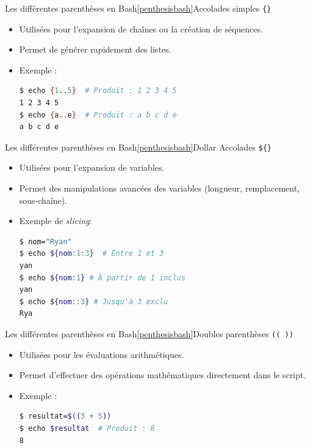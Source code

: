 \documentclass{beamer}
\begin{document}
    \begin{frame}[fragile]{Les différentes parenthèses en Bash\cref{penthesisbash}}{Accolades simples \texttt{\{\}}}
        \begin{itemize}
            \item Utilisées pour l'expansion de chaînes ou la création de séquences.
            \item Permet de générer rapidement des listes.
            \item Exemple :
            \begin{lstlisting}[language=bash]
$ echo {1..5}  # Produit : 1 2 3 4 5
1 2 3 4 5
$ echo {a..e}  # Produit : a b c d e
a b c d e
            \end{lstlisting}
        \end{itemize}
    \end{frame}

    \begin{frame}[fragile]{Les différentes parenthèses en Bash\cref{penthesisbash}}{Dollar Accolades \texttt{\$\{\}}}
        \begin{itemize}
            \item Utilisées pour l'expansion de variables.
            \item Permet des manipulations avancées des variables (longueur, remplacement, sous-chaîne).
            \item Exemple de \textit{slicing}:
            \begin{lstlisting}[language=bash]
$ nom="Ryan"
$ echo ${nom:1:3}  # Entre 1 et 3
yan
$ echo ${nom:1} # À partir de 1 inclus
yan
$ echo ${nom::3} # Jusqu'à 3 exclu
Rya
            \end{lstlisting}
        \end{itemize}
    \end{frame}

    \begin{frame}[fragile]{Les différentes parenthèses en Bash\cref{penthesisbash}}{Doubles parenthèses \lstinline{(( ))}}
        \begin{itemize}
            \item Utilisées pour les évaluations arithmétiques.
            \item Permet d'effectuer des opérations mathématiques directement dans le script.
            \item Exemple :
            \begin{lstlisting}[language=bash]
$ resultat=$((3 + 5))
$ echo $resultat  # Produit : 8
8
            \end{lstlisting}
        \end{itemize}
    \end{frame}
\end{document}
